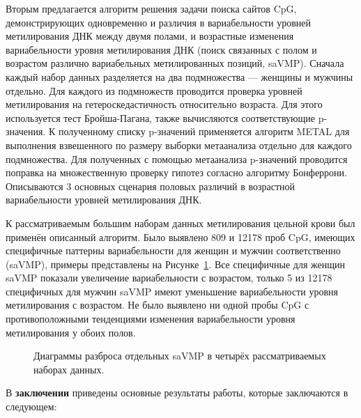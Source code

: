 Вторым предлагается алгоритм решения задачи поиска сайтов CpG, демонстрирующих одновременно и различия в вариабельности уровней метилирования ДНК между двумя полами, и возрастные изменения вариабельности уровня метилирования ДНК (поиск связанных с полом и возрастом различно вариабельных метилированных позиций, saVMP). Сначала каждый набор данных разделяется на два подмножества --- женщины и мужчины отдельно. Для каждого из подмножеств проводится проверка уровней метилирования на гетероскедастичность относительно возраста. Для этого используется тест Бройша-Пагана, также вычисляются соответствующие p-значения. К полученному списку p-значений применяется алгоритм METAL для выполнения взвешенного по размеру выборки метаанализа отдельно для каждого подмножества. Для полученных с помощью метаанализа p-значений проводится поправка на множественную проверку гипотез согласно алгоритму Бонферрони. Описываются 3 основных сценария половых различий в возрастной вариабельности уровней метилирования ДНК.

К рассматриваемым большим наборам данных метилирования цельной крови был применён описанный алгоритм. Было выявлено 809 и 12178 проб CpG, имеющих специфичные паттерны вариабельности для женщин и мужчин соответственно (saVMP), примеры представлены на Рисунке~\ref{fig:saVMP_synopsis}. Все специфичные для женщин saVMP показали увеличение вариабельности с возрастом, только 5 из 12178 специфичных для мужчин saVMP имеют уменьшение вариабельности уровня метилирования с возрастом. Не было выявлено ни одной пробы CpG с противоположными тенденциями изменения вариабельности уровня метилирования у обоих полов. 

\begin{figure}[ht]
	\caption{Диаграммы разброса отдельных saVMP в четырёх рассматриваемых наборах данных.}\label{fig:saVMP_synopsis}
\end{figure}





\FloatBarrier
{}                                  %
В \textbf{заключении} приведены основные результаты работы, которые заключаются в следующем:



